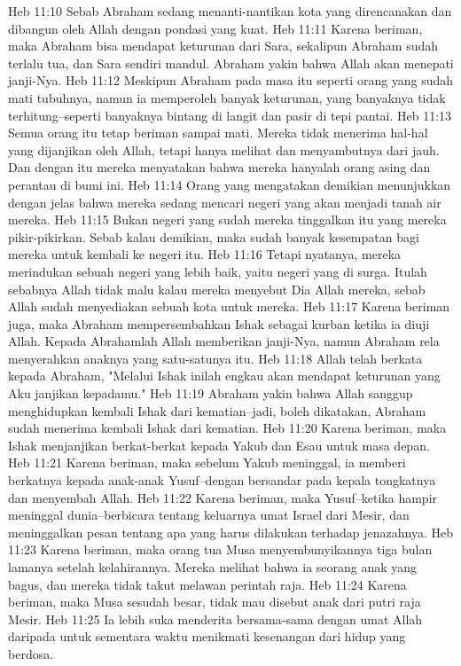 Heb 11:10  Sebab Abraham sedang menanti-nantikan kota yang direncanakan dan dibangun oleh Allah dengan pondasi yang kuat.
Heb 11:11  Karena beriman, maka Abraham bisa mendapat keturunan dari Sara, sekalipun Abraham sudah terlalu tua, dan Sara sendiri mandul. Abraham yakin bahwa Allah akan menepati janji-Nya.
Heb 11:12  Meskipun Abraham pada masa itu seperti orang yang sudah mati tubuhnya, namun ia memperoleh banyak keturunan, yang banyaknya tidak terhitung--seperti banyaknya bintang di langit dan pasir di tepi pantai.
Heb 11:13  Semua orang itu tetap beriman sampai mati. Mereka tidak menerima hal-hal yang dijanjikan oleh Allah, tetapi hanya melihat dan menyambutnya dari jauh. Dan dengan itu mereka menyatakan bahwa mereka hanyalah orang asing dan perantau di bumi ini.
Heb 11:14  Orang yang mengatakan demikian menunjukkan dengan jelas bahwa mereka sedang mencari negeri yang akan menjadi tanah air mereka.
Heb 11:15  Bukan negeri yang sudah mereka tinggalkan itu yang mereka pikir-pikirkan. Sebab kalau demikian, maka sudah banyak kesempatan bagi mereka untuk kembali ke negeri itu.
Heb 11:16  Tetapi nyatanya, mereka merindukan sebuah negeri yang lebih baik, yaitu negeri yang di surga. Itulah sebabnya Allah tidak malu kalau mereka menyebut Dia Allah mereka, sebab Allah sudah menyediakan sebuah kota untuk mereka.
Heb 11:17  Karena beriman juga, maka Abraham mempersembahkan Ishak sebagai kurban ketika ia diuji Allah. Kepada Abrahamlah Allah memberikan janji-Nya, namun Abraham rela menyerahkan anaknya yang satu-satunya itu.
Heb 11:18  Allah telah berkata kepada Abraham, "Melalui Ishak inilah engkau akan mendapat keturunan yang Aku janjikan kepadamu."
Heb 11:19  Abraham yakin bahwa Allah sanggup menghidupkan kembali Ishak dari kematian--jadi, boleh dikatakan, Abraham sudah menerima kembali Ishak dari kematian.
Heb 11:20  Karena beriman, maka Ishak menjanjikan berkat-berkat kepada Yakub dan Esau untuk masa depan.
Heb 11:21  Karena beriman, maka sebelum Yakub meninggal, ia memberi berkatnya kepada anak-anak Yusuf--dengan bersandar pada kepala tongkatnya dan menyembah Allah.
Heb 11:22  Karena beriman, maka Yusuf--ketika hampir meninggal dunia--berbicara tentang keluarnya umat Israel dari Mesir, dan meninggalkan pesan tentang apa yang harus dilakukan terhadap jenazahnya.
Heb 11:23  Karena beriman, maka orang tua Musa menyembunyikannya tiga bulan lamanya setelah kelahirannya. Mereka melihat bahwa ia seorang anak yang bagus, dan mereka tidak takut melawan perintah raja.
Heb 11:24  Karena beriman, maka Musa sesudah besar, tidak mau disebut anak dari putri raja Mesir.
Heb 11:25  Ia lebih suka menderita bersama-sama dengan umat Allah daripada untuk sementara waktu menikmati kesenangan dari hidup yang berdosa.
